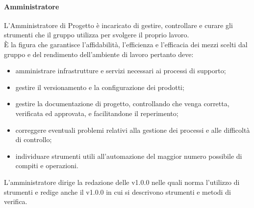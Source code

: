             \paragraph{Amministratore }
                L’Amministratore di Progetto è incaricato di gestire, controllare e curare gli strumenti che il gruppo utilizza per svolgere il proprio lavoro. \\
                È la figura che garantisce l’affidabilità, l’efficienza e l’efficacia dei mezzi scelti dal gruppo e del rendimento dell’ambiente di lavoro pertanto deve:\\
                \begin{itemize}
                    \item amministrare infrastrutture e servizi necessari ai processi di supporto;
                    \item gestire il versionamento e la configurazione dei prodotti;
                    \item gestire la documentazione di progetto, controllando che venga corretta, verificata ed approvata, e facilitandone il reperimento;
                    \item correggere eventuali problemi relativi alla gestione dei processi e alle difficoltà di controllo;
                    \item individuare strumenti utili all’automazione del maggior numero possibile di compiti e operazioni.
                \end{itemize}
                L’amministratore dirige la redazione delle  v1.0.0 nelle quali norma l’utilizzo di strumenti e redige anche il  v1.0.0 in cui si descrivono strumenti e metodi di verifica.

